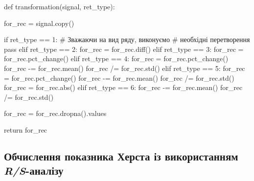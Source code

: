 \documentclass[
  letterpaper,
]{report}
\newenvironment{Shaded}{\begin{snugshade}}{\end{snugshade}}
\newcommand{\BuiltInTok}[1]{\textcolor[rgb]{0.00,0.23,0.31}{#1}}
\newcommand{\CommentTok}[1]{\textcolor[rgb]{0.37,0.37,0.37}{#1}}
\newcommand{\ControlFlowTok}[1]{\textcolor[rgb]{0.00,0.23,0.31}{#1}}
\newcommand{\DecValTok}[1]{\textcolor[rgb]{0.68,0.00,0.00}{#1}}
\newcommand{\KeywordTok}[1]{\textcolor[rgb]{0.00,0.23,0.31}{#1}}
\newcommand{\NormalTok}[1]{\textcolor[rgb]{0.00,0.23,0.31}{#1}}
\newcommand{\OperatorTok}[1]{\textcolor[rgb]{0.37,0.37,0.37}{#1}}
\begin{document}
\begin{Shaded}
\begin{Highlighting}[]
\KeywordTok{def}\NormalTok{ transformation(signal, ret\_type):}

\NormalTok{    for\_rec }\OperatorTok{=}\NormalTok{ signal.copy()}

    \ControlFlowTok{if}\NormalTok{ ret\_type }\OperatorTok{==} \DecValTok{1}\NormalTok{:       }\CommentTok{\# Зважаючи на вид ряду, виконуємо}
                            \CommentTok{\# необхідні перетворення}
        \ControlFlowTok{pass}
    \ControlFlowTok{elif}\NormalTok{ ret\_type }\OperatorTok{==} \DecValTok{2}\NormalTok{:}
\NormalTok{        for\_rec }\OperatorTok{=}\NormalTok{ for\_rec.diff()}
    \ControlFlowTok{elif}\NormalTok{ ret\_type }\OperatorTok{==} \DecValTok{3}\NormalTok{:}
\NormalTok{        for\_rec }\OperatorTok{=}\NormalTok{ for\_rec.pct\_change()}
    \ControlFlowTok{elif}\NormalTok{ ret\_type }\OperatorTok{==} \DecValTok{4}\NormalTok{:}
\NormalTok{        for\_rec }\OperatorTok{=}\NormalTok{ for\_rec.pct\_change()}
\NormalTok{        for\_rec }\OperatorTok{{-}=}\NormalTok{ for\_rec.mean()}
\NormalTok{        for\_rec }\OperatorTok{/=}\NormalTok{ for\_rec.std()}
    \ControlFlowTok{elif}\NormalTok{ ret\_type }\OperatorTok{==} \DecValTok{5}\NormalTok{: }
\NormalTok{        for\_rec }\OperatorTok{=}\NormalTok{ for\_rec.pct\_change()}
\NormalTok{        for\_rec }\OperatorTok{{-}=}\NormalTok{ for\_rec.mean()}
\NormalTok{        for\_rec }\OperatorTok{/=}\NormalTok{ for\_rec.std()}
\NormalTok{        for\_rec }\OperatorTok{=}\NormalTok{ for\_rec.}\BuiltInTok{abs}\NormalTok{()}
    \ControlFlowTok{elif}\NormalTok{ ret\_type }\OperatorTok{==} \DecValTok{6}\NormalTok{:}
\NormalTok{        for\_rec }\OperatorTok{{-}=}\NormalTok{ for\_rec.mean()}
\NormalTok{        for\_rec }\OperatorTok{/=}\NormalTok{ for\_rec.std()}

\NormalTok{    for\_rec }\OperatorTok{=}\NormalTok{ for\_rec.dropna().values}

    \ControlFlowTok{return}\NormalTok{ for\_rec}
\end{Highlighting}
\end{Shaded}

\hypertarget{ux43eux431ux447ux438ux441ux43bux435ux43dux43dux44f-ux43fux43eux43aux430ux437ux43dux438ux43aux430-ux445ux435ux440ux441ux442ux430-ux456ux437-ux432ux438ux43aux43eux440ux438ux441ux442ux430ux43dux43dux44fux43c-rs-ux430ux43dux430ux43bux456ux437ux443}{%
\subsection{\texorpdfstring{Обчислення показника Херста із використанням
\emph{R/S}-аналізу}{Обчислення показника Херста із використанням R/S-аналізу}}\label{ux43eux431ux447ux438ux441ux43bux435ux43dux43dux44f-ux43fux43eux43aux430ux437ux43dux438ux43aux430-ux445ux435ux440ux441ux442ux430-ux456ux437-ux432ux438ux43aux43eux440ux438ux441ux442ux430ux43dux43dux44fux43c-rs-ux430ux43dux430ux43bux456ux437ux443}}
\end{document}
